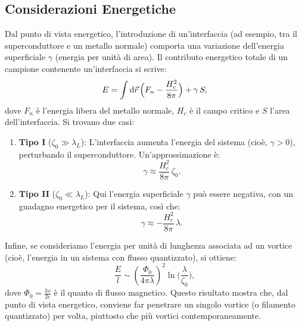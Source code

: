 \subsection{Considerazioni Energetiche}
Dal punto di vista energetico, l'introduzione di un'interfaccia (ad esempio, tra il superconduttore e un metallo normale) comporta una variazione dell'energia superficiale \(\gamma\) (energia per unità di area).  
Il contributo energetico totale di un campione contenente un'interfaccia si scrive:
\[
E = \int \text{d}\vec{r}\,\Bigl(F_n - \frac{H_c^2}{8\pi}\Bigr) + \gamma\, S,
\]
dove \(F_n\) è l'energia libera del metallo normale, \(H_c\) è il campo critico e \(S\) l'area dell'interfaccia.  
Si trovano due casi:
\begin{enumerate}
    \item \textbf{Tipo I} (\(\zeta_0 \gg \lambda_L\)): L'interfaccia aumenta l'energia del sistema (cioè, \(\gamma > 0\)), perturbando il superconduttore. Un'approssimazione è:
    \[
    \gamma \approx \frac{H_c^2}{8\pi}\,\zeta_0.
    \]
    \item \textbf{Tipo II} (\(\zeta_0 \ll \lambda_L\)): Qui l'energia superficiale \(\gamma\) può essere negativa, con un guadagno energetico per il sistema, così che:
    \[
    \gamma \approx - \frac{H_c^2}{8\pi}\,\lambda.
    \]
\end{enumerate}
Infine, se consideriamo l'energia per unità di lunghezza associata ad un vortice (cioè, l'energia in un sistema con flusso quantizzato), si ottiene:
\[
\frac{E}{l} \sim \left(\frac{\Phi_0}{4\pi\lambda}\right)^2 \ln\biggl(\frac{\lambda}{\zeta_0}\biggr),
\]
dove \(\Phi_0 = \frac{hc}{2e}\) è il quanto di flusso magnetico. Questo risultato mostra che, dal punto di vista energetico, conviene far penetrare un singolo vortice (o filamento quantizzato) per volta, piuttosto che più vortici contemporaneamente.


